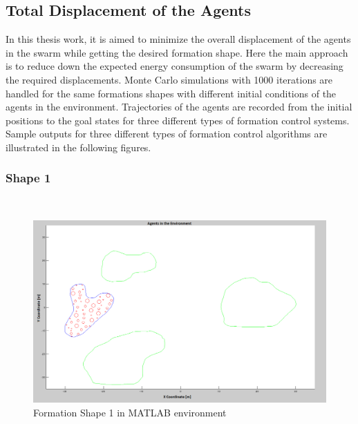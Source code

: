 \subsection{Total Displacement of the Agents}  \label{total_dist_ref}
		
In this thesis work, it is aimed to minimize the overall displacement of the agents in the swarm while getting the desired formation shape. Here the main approach is to reduce down the expected energy consumption of the swarm by decreasing the required displacements. Monte Carlo simulations with 1000 iterations are handled for the same formations shapes with different initial conditions of the agents in the environment. Trajectories of the agents are recorded from the initial positions to the goal states for three different types of formation control systems. Sample outputs for three different types of formation control algorithms are illustrated in the following figures.
		
\subsubsection{Shape 1}\hspace{0pt} \\
		
\begin{figure}[H]
\caption{Formation Shape 1 in MATLAB environment}
\centerline{\includegraphics[scale = 0.40]{Trajectories_Formation_Shape_1_2}}
\end{figure} 	
			
